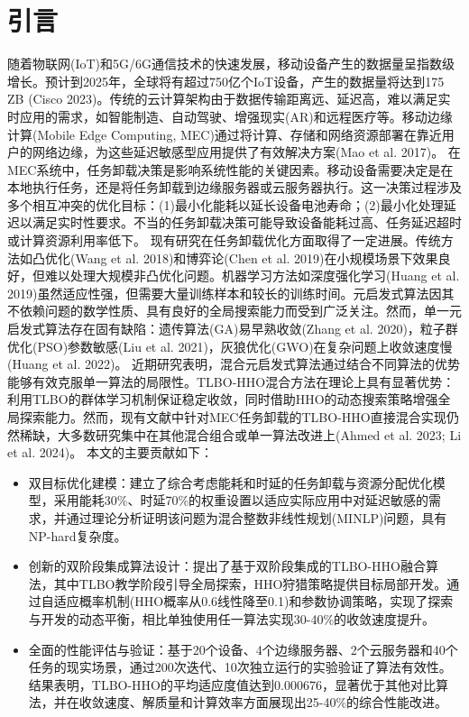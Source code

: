 \documentclass[conference]{IEEEtran}
\begin{document}
\section{引言}
随着物联网(IoT)和5G/6G通信技术的快速发展，移动设备产生的数据量呈指数级增长。预计到2025年，全球将有超过750亿个IoT设备，产生的数据量将达到175 ZB (Cisco 2023)。传统的云计算架构由于数据传输距离远、延迟高，难以满足实时应用的需求，如智能制造、自动驾驶、增强现实(AR)和远程医疗等。移动边缘计算(Mobile Edge Computing, MEC)通过将计算、存储和网络资源部署在靠近用户的网络边缘，为这些延迟敏感型应用提供了有效解决方案(Mao et al. 2017)。
在MEC系统中，任务卸载决策是影响系统性能的关键因素。移动设备需要决定是在本地执行任务，还是将任务卸载到边缘服务器或云服务器执行。这一决策过程涉及多个相互冲突的优化目标：(1)最小化能耗以延长设备电池寿命；(2)最小化处理延迟以满足实时性要求。不当的任务卸载决策可能导致设备能耗过高、任务延迟超时或计算资源利用率低下。
现有研究在任务卸载优化方面取得了一定进展。传统方法如凸优化(Wang et al. 2018)和博弈论(Chen et al. 2019)在小规模场景下效果良好，但难以处理大规模非凸优化问题。机器学习方法如深度强化学习(Huang et al. 2019)虽然适应性强，但需要大量训练样本和较长的训练时间。元启发式算法因其不依赖问题的数学性质、具有良好的全局搜索能力而受到广泛关注。然而，单一元启发式算法存在固有缺陷：遗传算法(GA)易早熟收敛(Zhang et al. 2020)，粒子群优化(PSO)参数敏感(Liu et al. 2021)，灰狼优化(GWO)在复杂问题上收敛速度慢(Huang et al. 2022)。
近期研究表明，混合元启发式算法通过结合不同算法的优势能够有效克服单一算法的局限性。TLBO-HHO混合方法在理论上具有显著优势：利用TLBO的群体学习机制保证稳定收敛，同时借助HHO的动态搜索策略增强全局探索能力。然而，现有文献中针对MEC任务卸载的TLBO-HHO直接混合实现仍然稀缺，大多数研究集中在其他混合组合或单一算法改进上(Ahmed et al. 2023; Li et al. 2024)。
本文的主要贡献如下：
\begin{itemize}
    \item 双目标优化建模：建立了综合考虑能耗和时延的任务卸载与资源分配优化模型，采用能耗30\%、时延70\%的权重设置以适应实际应用中对延迟敏感的需求，并通过理论分析证明该问题为混合整数非线性规划(MINLP)问题，具有NP-hard复杂度。
    \item 创新的双阶段集成算法设计：提出了基于双阶段集成的TLBO-HHO融合算法，其中TLBO教学阶段引导全局探索，HHO狩猎策略提供目标局部开发。通过自适应概率机制(HHO概率从0.6线性降至0.1)和参数协调策略，实现了探索与开发的动态平衡，相比单独使用任一算法实现30-40\%的收敛速度提升。
    \item 全面的性能评估与验证：基于20个设备、4个边缘服务器、2个云服务器和40个任务的现实场景，通过200次迭代、10次独立运行的实验验证了算法有效性。结果表明，TLBO-HHO的平均适应度值达到0.000676，显著优于其他对比算法，并在收敛速度、解质量和计算效率方面展现出25-40\%的综合性能改进。
\end{itemize}
\end{document}
